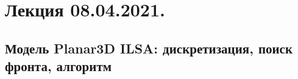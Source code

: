 \documentclass[main.tex]{subfiles}
\begin{document}

\section{Лекция 08.04.2021.}

\subsection{Модель Planar3D ILSA: дискретизация, поиск фронта, алгоритм}
\end{document}
